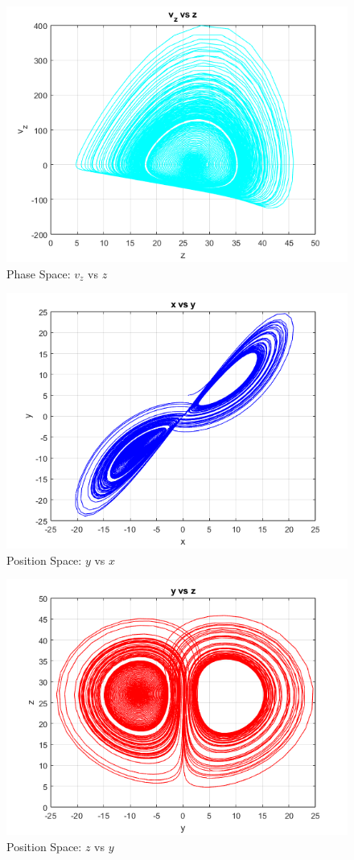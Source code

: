 \documentclass[%
reprint,
amsmath,amssymb,
aps,
floatfix,
]{revtex4-2}
\begin{document}
	\begin{figure}[htbp]
		\centering
		\includegraphics[width=0.8\linewidth]{v_z_vs_z.png}
		\caption{Phase Space: $v_z$ vs $z$}
		\label{fig:vz_z}
	\end{figure}
	
	\begin{figure}[htbp]
		\centering
		\includegraphics[width=0.8\linewidth]{y_vs_x.png}
		\caption{Position Space: $y$ vs $x$}
		\label{fig:y_x}
	\end{figure}
	
	\begin{figure}[htbp]
		\centering
		\includegraphics[width=0.8\linewidth]{z_vs_y.png}
		\caption{Position Space: $z$ vs $y$}
		\label{fig:z_y}
	\end{figure}
	
\end{document}
